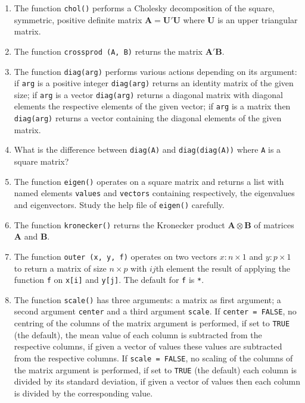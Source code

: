 \documentclass[
]{book}
\begin{document}
\begin{enumerate}
\def\labelenumi{(\alph{enumi})}
\item
  The function \texttt{chol()} performs a Cholesky decomposition of the square, symmetric, positive definite matrix \(\mathbf{A}=\mathbf{U}'\mathbf{U}\) where \(\mathbf{U}\) is an upper triangular matrix.
\item
  The function \texttt{crossprod\ (A,\ B)} returns the matrix \(\mathbf{A'B}\).
\item
  The function \texttt{diag(arg)} performs various actions depending on its argument: if \texttt{arg} is a positive integer \texttt{diag(arg)} returns an identity matrix of the given size; if \texttt{arg} is a vector \texttt{diag(arg)} returns a diagonal matrix with diagonal elements the respective elements of the given vector; if \texttt{arg} is a matrix then \texttt{diag(arg)} returns a vector containing the diagonal elements of the given matrix.
\item
  What is the difference between \texttt{diag(A)} and \texttt{diag(diag(A))} where \texttt{A} is a square matrix?
\item
  The function \texttt{eigen()} operates on a square matrix and returns a list with named elements \texttt{values} and \texttt{vectors} containing respectively, the eigenvalues and eigenvectors. Study the help file of \texttt{eigen()} carefully.
\item
  The function \texttt{kronecker()} returns the Kronecker product \(\mathbf{A} \otimes \mathbf{B}\) of matrices \(\mathbf{A}\) and \(\mathbf{B}\).
\item
  The function \texttt{outer\ (x,\ y,\ f)} operates on two vectors \(x:n\times 1\) and \(y:p\times 1\) to return a matrix of size \(n \times p\) with \(ij\)th element the result of applying the function \texttt{f} on \texttt{x{[}i{]}} and \texttt{y{[}j{]}}. The default for \texttt{f} is \texttt{*}.
\item
  The function \texttt{scale()} has three arguments: a matrix as first argument; a second argument \texttt{center} and a third argument \texttt{scale}. If \texttt{center\ =\ FALSE}, no centring of the columns of the matrix argument is performed, if set to \texttt{TRUE} (the default), the mean value of each column is subtracted from the respective columns, if given a vector of values these values are subtracted from the respective columns. If \texttt{scale\ =\ FALSE}, no scaling of the columns of the matrix argument is performed, if set to \texttt{TRUE} (the default) each column is divided by its standard deviation, if given a vector of values then each column is divided by the corresponding value.

\end{enumerate}
\end{document}
